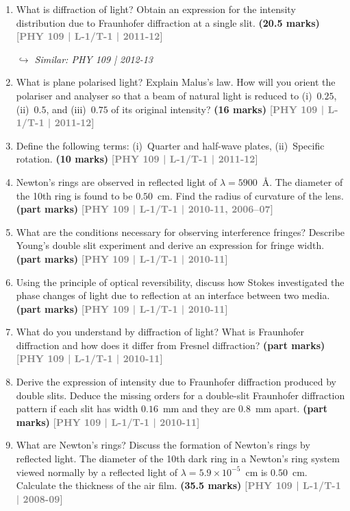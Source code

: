 \documentclass[12pt,a3paper]{article}
\newcommand{\yr}[1]{\hfill\textcolor{gray}{\small\textbf{[#1]}}}
\newcommand{\mk}[1]{\textcolor{orange!70!black}{\small\textbf{(#1 marks)}}}
\newcommand{\variant}[1]{\par\vspace{1pt}\textcolor{blue!50!black}%
  {\footnotesize\textit{$\hookrightarrow$ Similar: #1}}}
\begin{document}
\begin{enumerate}
\item What is diffraction of light? Obtain an expression for the intensity distribution due to Fraunhofer diffraction at a single slit.
\mk{20.5} \yr{PHY 109 | L-1/T-1 | 2011-12}
\variant{PHY 109 | 2012-13}

\item What is plane polarised light? Explain Malus's law. How will you orient the polariser and analyser so that a beam of natural light is reduced to (i)~$0.25$, (ii)~$0.5$, and (iii)~$0.75$ of its original intensity?
\mk{16} \yr{PHY 109 | L-1/T-1 | 2011-12}

\item Define the following terms: (i)~Quarter and half-wave plates, (ii)~Specific rotation.
\mk{10} \yr{PHY 109 | L-1/T-1 | 2011-12}

\item Newton's rings are observed in reflected light of $\lambda = 5900$~\AA. The diameter of the 10th ring is found to be $0.50$~cm. Find the radius of curvature of the lens.
\mk{part} \yr{PHY 109 | L-1/T-1 | 2010-11, 2006--07}

\item What are the conditions necessary for observing interference fringes? Describe Young's double slit experiment and derive an expression for fringe width.
\mk{part} \yr{PHY 109 | L-1/T-1 | 2010-11}

\item Using the principle of optical reversibility, discuss how Stokes investigated the phase changes of light due to reflection at an interface between two media.
\mk{part} \yr{PHY 109 | L-1/T-1 | 2010-11}

\item What do you understand by diffraction of light? What is Fraunhofer diffraction and how does it differ from Fresnel diffraction?
\mk{part} \yr{PHY 109 | L-1/T-1 | 2010-11}

\item Derive the expression of intensity due to Fraunhofer diffraction produced by double slits. Deduce the missing orders for a double-slit Fraunhofer diffraction pattern if each slit has width $0.16$~mm and they are $0.8$~mm apart.
\mk{part} \yr{PHY 109 | L-1/T-1 | 2010-11}

\item What are Newton's rings? Discuss the formation of Newton's rings by reflected light. The diameter of the 10th dark ring in a Newton's ring system viewed normally by a reflected light of $\lambda = 5.9\times10^{-5}$~cm is $0.50$~cm. Calculate the thickness of the air film.
\mk{35.5} \yr{PHY 109 | L-1/T-1 | 2008-09}


\end{enumerate}
\end{document}
